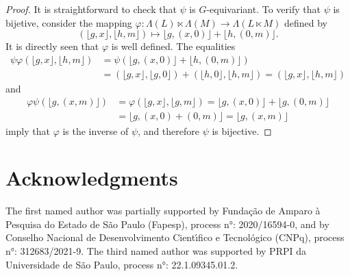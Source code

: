 \documentclass[11pt]{amsart}
\numberwithin{equation}{section}
\theoremstyle{definition}
\theoremstyle{remark}
\begin{document}
\begin{proof}
    It is straightforward to check that $\psi$ is $G$-equivariant. To verify that $\psi$ is bijetive, consider the mapping $\varphi: \Lambda(L)\ltimes \Lambda(M)\to \Lambda(L\ltimes M)$ defined by $$(\lfloor g,x\rfloor, \lfloor h,m\rfloor)\mapsto \lfloor g,(x,0)\rfloor+ \lfloor h,(0,m)\rfloor.$$  It is directly seen that $\varphi $ is well defined. The equalities 
\begin{align*}
\psi\varphi(\lfloor g,x\rfloor, \lfloor h,m\rfloor)&=\psi(\lfloor g,(x,0)\rfloor+ \lfloor h,(0,m)\rfloor)\\ &=(\lfloor g,x\rfloor,\lfloor g,0\rfloor)+(\lfloor h,0\rfloor,\lfloor h,m\rfloor)=(\lfloor g,x\rfloor,\lfloor h,m\rfloor)
\end{align*}    
    and 
\begin{align*}
\varphi\psi(\lfloor g,(x,m)\rfloor) &=\varphi(\lfloor g,x\rfloor, \lfloor g,m\rfloor)=\lfloor g,(x,0)\rfloor+ \lfloor g,(0,m)\rfloor\\&=\lfloor g,(x,0)+(0,m)\rfloor=\lfloor g,(x,m)\rfloor
\end{align*}
imply that $\varphi$ is the inverse of $\psi$, and therefore $\psi$ is bijective.
\end{proof}

\section*{Acknowledgments} 
 The first named author was partially supported by Funda\c c\~ao de Amparo \`a Pesquisa do Estado de S\~ao Paulo (Fapesp), process n°:  2020/16594-0, and by  Conselho Nacional de Desenvolvimento Cient\'{\i}fico e Tecnol{\'o}gico (CNPq), process n°: 312683/2021-9. The third named author was supported by PRPI da Universidade de São Paulo, process n°: 22.1.09345.01.2. 





\end{document}
